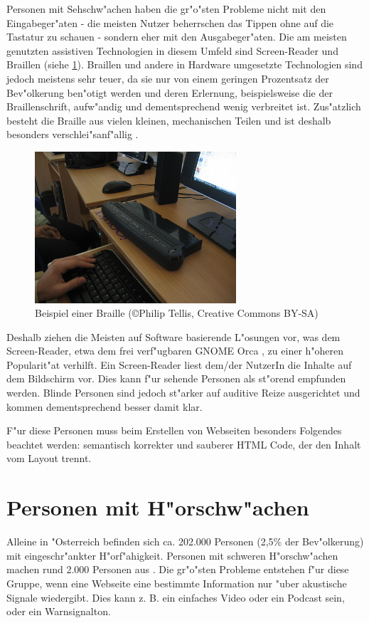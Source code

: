 \documentclass[a4paper,bibtotoc,oneside]{scrbook}
\begin{document}
Personen mit Sehschw"achen haben die gr"o"sten Probleme nicht mit den Eingabeger"aten - die meisten Nutzer beherrschen das Tippen ohne auf die Tastatur zu schauen - sondern eher mit den Ausgabeger"aten. Die am meisten genutzten assistiven Technologien in diesem Umfeld sind Screen-Reader und Braillen (siehe \ref{Abb1}). Braillen und andere in Hardware umgesetzte Technologien sind jedoch meistens sehr teuer, da sie nur von einem geringen Prozentsatz der Bev"olkerung ben"otigt werden und deren Erlernung, beispielsweise die der Braillenschrift, aufw"andig und dementsprechend wenig verbreitet ist\cite[S. 249-250]{screen_read_frust}.
Zus"atzlich besteht die Braille aus vielen kleinen, mechanischen Teilen und ist deshalb besonders verschlei"sanf"allig \cite[S. 11]{barr_webd}.

\begin{figure}[braille]
\centering
\includegraphics[width=75mm]{braille}
\caption[Beispiel einer Braille]{Beispiel einer Braille (\copyright  Philip Tellis, Creative Commons BY-SA)}\label{Abb1}
\end{figure}

Deshalb ziehen die Meisten auf Software basierende L"osungen vor, was dem Screen-Reader, etwa dem frei verf"ugbaren GNOME Orca \cite{orca}, zu einer h"oheren Popularit"at verhilft\cite[S. 249-250]{screen_read_frust}. Ein Screen-Reader liest dem/der NutzerIn die Inhalte auf dem Bildschirm vor. Dies kann f"ur sehende Personen als st"orend empfunden werden. Blinde Personen sind jedoch st"arker auf auditive Reize ausgerichtet und kommen dementsprechend besser damit klar\cite[S. 13]{barr_webd}. 

F"ur diese Personen muss beim Erstellen von Webseiten besonders Folgendes beachtet werden: semantisch korrekter und sauberer HTML Code, der den Inhalt vom Layout trennt.\cite[S. 13-15]{barr_webd}

\section{Personen mit H"orschw"achen}
Alleine in "Osterreich befinden sich ca. 202.000 Personen (2,5\% der Bev"olkerung) mit eingeschr"ankter H"orf"ahigkeit. Personen mit schweren H"orschw"achen machen rund 2.000 Personen aus \cite[S. 13-14]{stat_austria}. Die gr"o"sten Probleme entstehen f"ur diese Gruppe, wenn eine Webseite eine bestimmte Information nur "uber akustische Signale wiedergibt. Dies kann z. B. ein einfaches Video oder ein Podcast sein, oder ein Warnsignalton. \cite[S. 17]{barr_webd}\cite[S. 20]{understand_acc}
\end{document}

